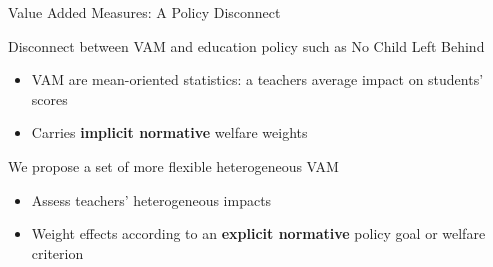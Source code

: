\documentclass[11pt]{beamer}
\newenvironment{wideitemize}{\itemize\addtolength{\itemsep}{14pt}}{\enditemize}
\begin{document}

\begin{frame}{Value Added Measures: A Policy Disconnect  }
\begin{wideitemize}

    \item Disconnect between VAM and education policy such as No Child Left Behind
    \begin{itemize}
        \item VAM are mean-oriented statistics: a teachers average impact on students' scores
        \item Carries \textbf{implicit normative} welfare weights 
    \end{itemize}
    
    \item  We propose a set of more flexible heterogeneous VAM 
    \begin{itemize}
        \item Assess teachers' heterogeneous impacts
        \item  Weight effects according to an \textbf{explicit normative} policy goal or welfare criterion
    \end{itemize}


\end{wideitemize}

\end{frame}


\end{document}
